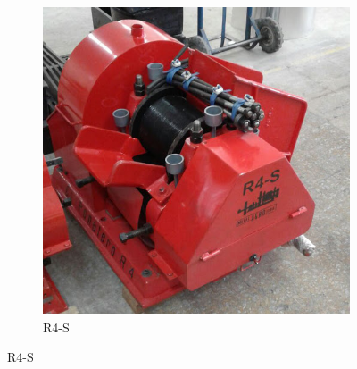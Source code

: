 \documentclass{article}%
\begin{document}
\begin{figure}[h!]
\begin{subfigure}{0.33\linewidth}
\includegraphics[width=0.95\linewidth]{Molinos/R4-S.jpg}%
\caption{R4{-}S}%
\end{subfigure}%
\linebreak%
\newpage%
\end{figure}
\end{document}
